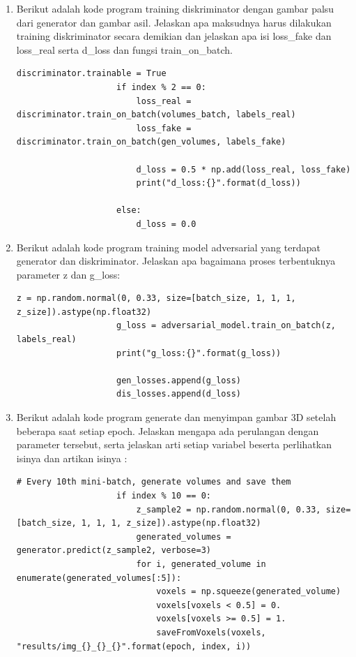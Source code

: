 \begin{enumerate}
    \item Berikut adalah kode program training diskriminator dengan gambar palsu dari generator dan gambar asil. Jelaskan apa maksudnya harus dilakukan training diskriminator secara demikian dan jelaskan apa isi loss\_fake dan loss\_real serta d\_loss dan fungsi train\_on\_batch.
    \begin{lstlisting}[caption=Training Diskriminator,label={lst:8.11}]
                    discriminator.trainable = True
                    if index % 2 == 0:
                        loss_real = discriminator.train_on_batch(volumes_batch, labels_real)
                        loss_fake = discriminator.train_on_batch(gen_volumes, labels_fake)

                        d_loss = 0.5 * np.add(loss_real, loss_fake)
                        print("d_loss:{}".format(d_loss))

                    else:
                        d_loss = 0.0
    \end{lstlisting}

    \item Berikut adalah kode program training model adversarial yang terdapat generator dan diskriminator. Jelaskan apa bagaimana proses terbentuknya parameter z dan g\_loss:
    \begin{lstlisting}[caption=Training adversarial model,label={lst:8.12}]
                    z = np.random.normal(0, 0.33, size=[batch_size, 1, 1, 1, z_size]).astype(np.float32)
                    g_loss = adversarial_model.train_on_batch(z, labels_real)
                    print("g_loss:{}".format(g_loss))

                    gen_losses.append(g_loss)
                    dis_losses.append(d_loss)
    \end{lstlisting}

    \item Berikut adalah kode program generate dan menyimpan gambar 3D setelah beberapa saat setiap epoch. Jelaskan mengapa ada perulangan dengan parameter tersebut, serta jelaskan arti setiap variabel beserta perlihatkan isinya dan artikan isinya :
    \begin{lstlisting}[caption=Buat dan simpan gambar 3D,label={lst:8.13}]
                    # Every 10th mini-batch, generate volumes and save them
                    if index % 10 == 0:
                        z_sample2 = np.random.normal(0, 0.33, size=[batch_size, 1, 1, 1, z_size]).astype(np.float32)
                        generated_volumes = generator.predict(z_sample2, verbose=3)
                        for i, generated_volume in enumerate(generated_volumes[:5]):
                            voxels = np.squeeze(generated_volume)
                            voxels[voxels < 0.5] = 0.
                            voxels[voxels >= 0.5] = 1.
                            saveFromVoxels(voxels, "results/img_{}_{}_{}".format(epoch, index, i))
    \end{lstlisting}


\end{enumerate}
